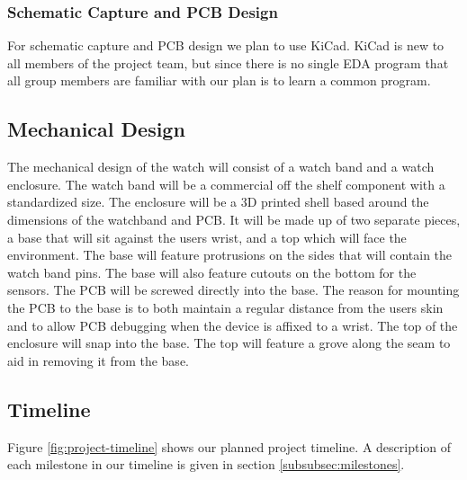 \subsubsection{Schematic Capture and PCB Design}

For schematic capture and PCB design we plan to use KiCad.  KiCad is new to all
members of the project team, but since there is no single EDA program that
all group members are familiar with our plan is to learn a common
program.

\subsection{Mechanical Design}

The mechanical design of the watch will consist of a watch band and a watch
enclosure.  The watch band will be a commercial off the shelf component with a
standardized size.  The enclosure will be a 3D printed shell based around the
dimensions of the watchband and PCB.  It will be made up of two separate pieces,
a base that will sit against the users wrist, and a top which will face the
environment.  The base will feature protrusions on the sides that will contain
the watch band pins.  The base will also feature cutouts on the bottom for the
sensors.  The PCB will be screwed directly into the base.  The reason for
mounting the PCB to the base is to both maintain a regular distance from the
users skin and to allow PCB debugging when the device is affixed to a wrist.
The top of the enclosure will snap into the base.  The top will feature a grove
along the seam to aid in removing it from the base.

\subsection{Timeline}

Figure \ref{fig:project-timeline} shows our planned project timeline. A
description of each milestone in our timeline is given in section
\ref{subsubsec:milestones}.


